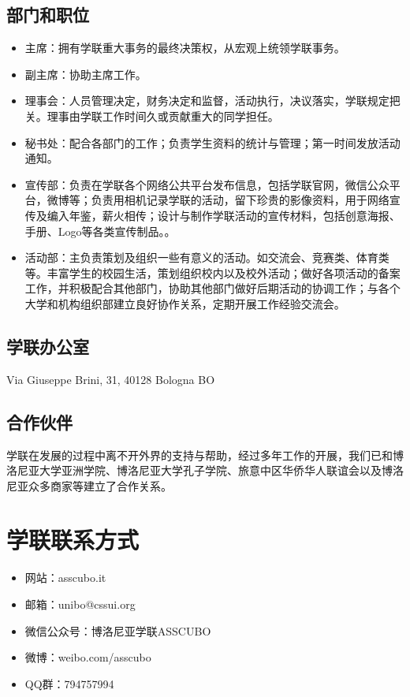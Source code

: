 \subsection{部门和职位}
\begin{itemize}
\item 主席：拥有学联重大事务的最终决策权，从宏观上统领学联事务。
\item 副主席：协助主席工作。 
\item 理事会：人员管理决定，财务决定和监督，活动执行，决议落实，学联规定把关。理事由学联工作时间久或贡献重大的同学担任。
\item 秘书处：配合各部门的工作；负责学生资料的统计与管理；第一时间发放活动通知。
\item 宣传部：负责在学联各个网络公共平台发布信息，包括学联官网，微信公众平台，微博等；负责用相机记录学联的活动，留下珍贵的影像资料，用于网络宣传及编入年鉴，薪火相传；设计与制作学联活动的宣传材料，包括创意海报、手册、Logo等各类宣传制品。。
\item 活动部：主负责策划及组织一些有意义的活动。如交流会、竞赛类、体育类等。丰富学生的校园生活，策划组织校内以及校外活动；做好各项活动的备案工作，并积极配合其他部门，协助其他部门做好后期活动的协调工作；与各个大学和机构组织部建立良好协作关系，定期开展工作经验交流会。
\end{itemize}


\subsection{学联办公室}
Via Giuseppe Brini, 31, 40128 Bologna BO


\subsection{合作伙伴}
学联在发展的过程中离不开外界的支持与帮助，经过多年工作的开展，我们已和博洛尼亚大学亚洲学院、博洛尼亚大学孔子学院、旅意中区华侨华人联谊会以及博洛尼亚众多商家等建立了合作关系。

\section{学联联系方式}
\begin{itemize}
\item 网站：asscubo.it 
\item 邮箱：unibo@cssui.org
\item 微信公众号：博洛尼亚学联ASSCUBO
\item 微博：weibo.com/asscubo
\item QQ群：794757994
\end{itemize}


